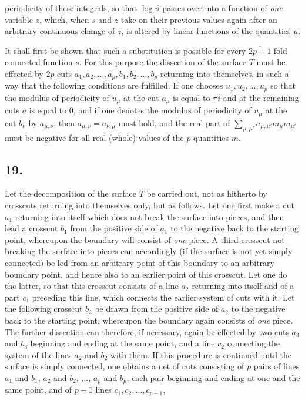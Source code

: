 \documentclass{article}
\begin{document}
periodicity of these integrals, so that $\log\vartheta$ passes over into a function of \emph{one} variable $z$, which, when $s$ and $z$ take on their previous values again after an arbitrary continuous change of $z$, is altered by linear functions of the quantities $u$.

It shall first be shown that such a substitution is possible for every $\overline{2p+1}$-fold connected function $s$. For this purpose the dissection of the surface $T$ must be effected by $2p$ cuts $a_{1}, a_{2}, \ldots, a_{p}, b_{1}, b_{2}, \ldots, b_{p}$ returning into themselves, in such a way that the following conditions are fulfilled. If one chooses $u_{1}, u_{2}, \ldots, u_{p}$ so that the modulus of periodicity of $u_{\mu}$ at the cut $a_{\mu}$ is equal to $\pi i$ and at the remaining cuts $a$ is equal to 0, and if one denotes the modulus of periodicity of $u_{\mu}$ at the cut $b_{\nu}$ by $a_{\mu,\nu}$, then $a_{\mu,\nu} = a_{\nu,\mu}$ must hold, and the real part of $\displaystyle\sum_{\mu,\mu'} a_{\mu,\mu'} m_{\mu} m_{\mu'}$ must be negative for all real (whole) values of the $p$ quantities $m$.

\subsection*{19.}

Let the decomposition of the surface $T$ be carried out, not as hitherto by crosscuts returning into themselves only, but as follows. Let one first make a cut $a_{1}$ returning into itself which does not break the surface into pieces, and then lead a crosscut $b_{1}$ from the positive side of $a_{1}$ to the negative back to the starting point, whereupon the boundary will consist of \emph{one} piece. A third crosscut not breaking the surface into pieces can accordingly (if the surface is not yet simply connected) be led from an arbitrary point of this boundary to an arbitrary boundary point, and hence also to an earlier point of this crosscut. Let one do the latter, so that this crosscut consists of a line $a_{2}$ returning into itself and of a part $c_{1}$ preceding this line, which connects the earlier system of cuts with it. Let the following crosscut $b_{2}$ be drawn from the positive side of $a_{2}$ to the negative back to the starting point, whereupon the boundary again consists of \emph{one} piece. The further dissection can therefore, if necessary, again be effected by two cuts $a_{3}$ and $b_{3}$ beginning and ending at the same point, and a line $c_{2}$ connecting the system of the lines $a_{2}$ and $b_{2}$ with them. If this procedure is continued until the surface is simply connected, one obtains a net of cuts consisting of $p$ pairs of lines $a_{1}$ and $b_{1}$, $a_{2}$ and $b_{2}$, $\ldots$, $a_{p}$ and $b_{p}$, each pair beginning and ending at one and the same point, and of $p-1$ lines $c_{1}, c_{2}, \ldots, c_{p-1}$,
\end{document}
